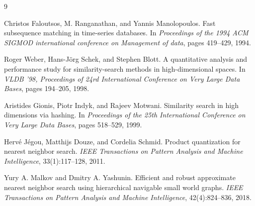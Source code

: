 \documentclass[sigconf]{acmart}
\begin{document}
\begin{thebibliography}{9}

Christos Faloutsos, M. Ranganathan, and Yannis Manolopoulos.
\newblock Fast subsequence matching in time-series databases.
\newblock In \emph{Proceedings of the 1994 ACM SIGMOD international conference on Management of data}, pages 419--429, 1994.

Roger Weber, Hans-Jörg Schek, and Stephen Blott.
\newblock A quantitative analysis and performance study for similarity-search methods in high-dimensional spaces.
\newblock In \emph{VLDB '98, Proceedings of 24rd International Conference on Very Large Data Bases}, pages 194--205, 1998.

Aristides Gionis, Piotr Indyk, and Rajeev Motwani.
\newblock Similarity search in high dimensions via hashing.
\newblock In \emph{Proceedings of the 25th International Conference on Very Large Data Bases}, pages 518--529, 1999.

Hervé Jégou, Matthijs Douze, and Cordelia Schmid.
\newblock Product quantization for nearest neighbor search.
\newblock \emph{IEEE Transactions on Pattern Analysis and Machine Intelligence}, 33(1):117--128, 2011.

Yury A. Malkov and Dmitry A. Yashunin.
\newblock Efficient and robust approximate nearest neighbor search using hierarchical navigable small world graphs.
\newblock \emph{IEEE Transactions on Pattern Analysis and Machine Intelligence}, 42(4):824--836, 2018.

\end{thebibliography}
\end{document}
